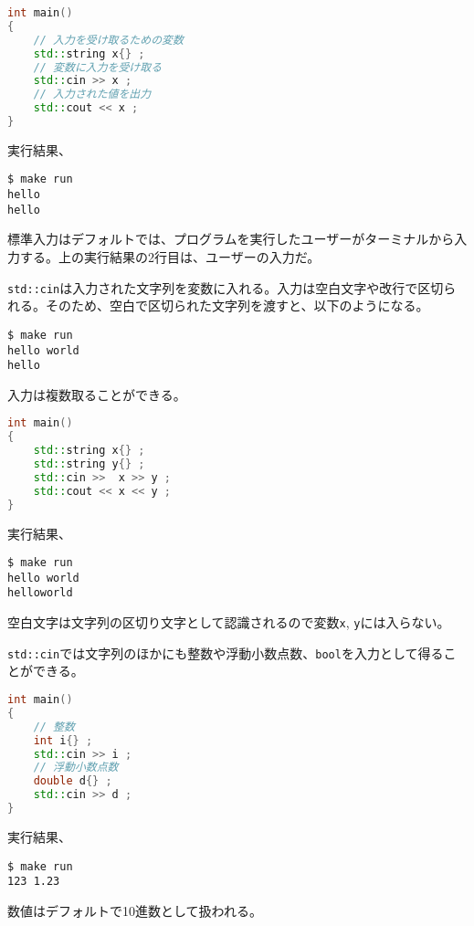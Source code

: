 \begin{lstlisting}[language={C++}]
int main()
{
    // 入力を受け取るための変数
    std::string x{} ;
    // 変数に入力を受け取る
    std::cin >> x ;
    // 入力された値を出力
    std::cout << x ;
}
\end{lstlisting}

\ifTombow\pagebreak\fi
実行結果、

\begin{lstlisting}[style=terminal]
$ make run
hello
hello
\end{lstlisting}

標準入力はデフォルトでは、プログラムを実行したユーザーがターミナルから入力する。上の実行結果の2行目は、ユーザーの入力だ。

\texttt{std::cin}は入力された文字列を変数に入れる。入力は空白文字や改行で区切られる。そのため、空白で区切られた文字列を渡すと、以下のようになる。

\begin{lstlisting}[style=terminal]
$ make run
hello world
hello
\end{lstlisting}

入力は複数取ることができる。

\begin{lstlisting}[language={C++}]
int main()
{
    std::string x{} ;
    std::string y{} ;
    std::cin >>  x >> y ;
    std::cout << x << y ;
}
\end{lstlisting}

実行結果、

\begin{lstlisting}[style=terminal]
$ make run
hello world
helloworld
\end{lstlisting}

空白文字は文字列の区切り文字として認識されるので変数\texttt{x}, \texttt{y}には入らない。

\texttt{std::cin}では文字列のほかにも整数や浮動小数点数、\texttt{bool}を入力として得ることができる。

\begin{lstlisting}[language={C++}]
int main()
{
    // 整数
    int i{} ;
    std::cin >> i ;
    // 浮動小数点数
    double d{} ;
    std::cin >> d ;
}
\end{lstlisting}

実行結果、

\begin{lstlisting}[style=terminal]
$ make run
123 1.23
\end{lstlisting}

数値はデフォルトで10進数として扱われる。

